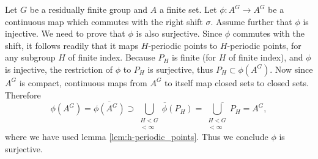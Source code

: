 Let $G$ be a residually finite group and $A$ a finite set. Let $\phi: A^G \to A^G$ be a continuous map which commutes with the right shift $\sigma$. Assume further that $\phi$ is injective. We need to prove that $\phi$ is also surjective. Since $\phi$ commutes with the shift, it follows readily that it maps $H$-periodic points to $H$-periodic points, for any subgroup $H$ of finite index.
Because $P_H$ is finite (for $H$ of finite index), and $\phi$ is injective, the restriction of $\phi$ to $P_H$ is surjective, thus $P_H \subset \phi(A^G)$. Now since $A^G$ is compact, continuous maps from $A^G$ to itself map closed sets to closed sets. Therefore
\[
\phi(A^G) = \overline{\phi(A^G)} \supset
\overline{\bigcup_{\substack{H < G \\ [G : H] < \infty}}\phi( P_H)}
= \overline{\bigcup_{\substack{H < G \\ [G : H] < \infty}} P_H} = A^G,
\]
where we have used lemma \ref{lem:h-periodic_points}. Thus we conclude $\phi$ is surjective.
